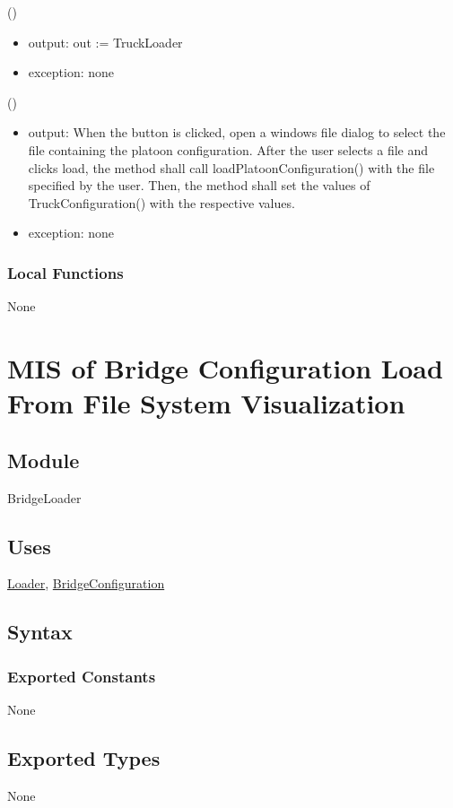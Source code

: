 \documentclass[12pt, titlepage]{article}
\begin{document}
()
\begin{itemize}
\item output: out :=  TruckLoader
\item exception: none
\end{itemize}

()
\begin{itemize} 
\item output: When the button is clicked, open a windows file dialog to select the file containing the platoon configuration. After the user selects a file and clicks load, the method shall call loadPlatoonConfiguration() with the file specified by the user. Then, the method shall set the values of TruckConfiguration() with the respective values.
\item exception: none
\end{itemize}

\subsubsection{Local Functions}
None
\newpage
\section{MIS of Bridge Configuration Load From File System Visualization} \label{BridgeLoader}

\subsection{Module}

BridgeLoader

\subsection{Uses}
\hyperref[Loader]{Loader}, \hyperref[BridgeConfiguration]{BridgeConfiguration}

\subsection{Syntax}

\subsubsection{Exported Constants}
None
\subsection{Exported Types}
None
\end{document}
